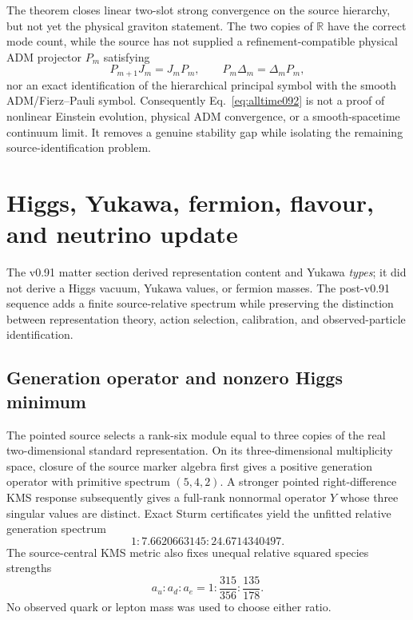 \documentclass[11pt]{article}
\theoremstyle{definition}
\theoremstyle{remark}
\begin{document}
The theorem closes linear two-slot strong convergence on the source hierarchy, but not yet the physical graviton statement. The two copies of $\mathbb R$ have the correct mode count, while the source has not supplied a refinement-compatible physical ADM projector $P_m$ satisfying
\begin{equation}
 P_{m+1}J_m=J_mP_m,
 \qquad
 P_m\Delta_m=\Delta_mP_m,
\end{equation}
nor an exact identification of the hierarchical principal symbol with the smooth ADM/Fierz--Pauli symbol. Consequently Eq.~\eqref{eq:alltime092} is not a proof of nonlinear Einstein evolution, physical ADM convergence, or a smooth-spacetime continuum limit. It removes a genuine stability gap while isolating the remaining source-identification problem.

\section{Higgs, Yukawa, fermion, flavour, and neutrino update}\label{sec:matter092}

The v0.91 matter section derived representation content and Yukawa \emph{types}; it did not derive a Higgs vacuum, Yukawa values, or fermion masses. The post-v0.91 sequence adds a finite source-relative spectrum while preserving the distinction between representation theory, action selection, calibration, and observed-particle identification.

\subsection{Generation operator and nonzero Higgs minimum}

The pointed source selects a rank-six module equal to three copies of the real two-dimensional standard representation. On its three-dimensional multiplicity space, closure of the source marker algebra first gives a positive generation operator with primitive spectrum $(5,4,2)$. A stronger pointed right-difference KMS response subsequently gives a full-rank nonnormal operator $Y$ whose three singular values are distinct. Exact Sturm certificates yield the unfitted relative generation spectrum
\begin{equation}
 1:7.6620663145:24.6714340497.
 \label{eq:generation092}
\end{equation}
The source-central KMS metric also fixes unequal relative squared species strengths
\begin{equation}
 a_u:a_d:a_e=1:\frac{315}{356}:\frac{135}{178}.
 \label{eq:species092}
\end{equation}
No observed quark or lepton mass was used to choose either ratio.
\end{document}
